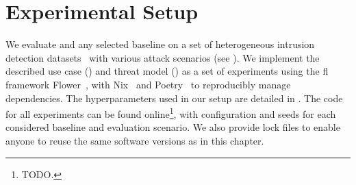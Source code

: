 \section{Experimental Setup\label{sec:radar.methodo}}

We evaluate \thecontrib and any selected baseline on a set of heterogeneous intrusion detection datasets~\cite{sarhan_StandardFeatureSet_2022} with various attack scenarios (see ).
We implement the described use case () and threat model () as a set of experiments using the \gls{fl} framework Flower~\cite{beutel_Flowerfriendlyfederated_2020}, with Nix~\cite{dolstra_purelyfunctionalsoftware_2006} and Poetry~\cite{eustace_Pythondependencymanagement_2018} to reproducibly manage dependencies.
The hyperparameters used in our setup are detailed in .
The code for all experiments can be found online\footnote{TODO.}, with configuration and seeds for each considered baseline and evaluation scenario. 
We also provide lock files to enable anyone to reuse the same software versions as in this chapter.


